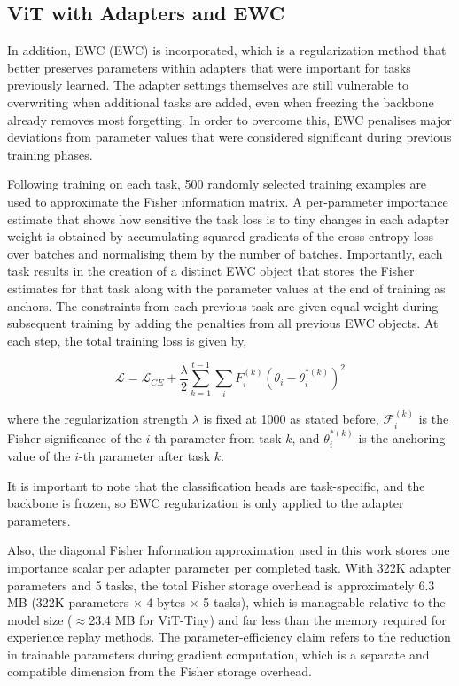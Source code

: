 \documentclass[english, LaM, oneside]{sapthesis}%
\numberwithin{equation}{chapter}
\begin{document}
\subsection{ViT with Adapters and EWC}
\label{sec:4.3.3}
In addition, EWC (EWC) is incorporated, which is a regularization method that better preserves parameters within adapters that were important for tasks previously learned. The adapter settings themselves are still vulnerable to overwriting when additional tasks are added, even when freezing the backbone already removes most forgetting. In order to overcome this, EWC penalises major deviations from parameter values that were considered significant during previous training phases.

Following training on each task, 500 randomly selected training examples are used to approximate the Fisher information matrix. A per-parameter importance estimate that shows how sensitive the task loss is to tiny changes in each adapter weight is obtained by accumulating squared gradients of the cross-entropy loss over batches and normalising them by the number of batches. Importantly, each task results in the creation of a distinct EWC object that stores the Fisher estimates for that task along with the parameter values at the end of training as anchors. The constraints from each previous task are given equal weight during subsequent training by adding the penalties from all previous EWC objects.
At each step, the total training loss is given by,

\begin{equation}
    \mathcal{L} = \mathcal{L}_{CE} + \frac{\lambda}{2} \sum_{k=1}^{t-1} \sum_{i} F_i^{(k)} {\left(\theta_i - \theta_i^{*(k)}\right)}^2
\end{equation}

where the regularization strength $\lambda$  is fixed at 1000 as stated before, $\mathcal{F}_i^{(k)}$ is the Fisher significance of the $i$-th parameter from task $k$, and $\theta_i^{*(k)}$ is the anchoring value of the $i$-th parameter after task $k$.

It is important to note that the classification heads are task-specific, and the backbone is frozen, so EWC regularization is only applied to the adapter parameters.

Also, the diagonal Fisher Information approximation used in this work stores one importance scalar per adapter parameter per completed task. With 322K adapter parameters and 5 tasks, the total Fisher storage overhead is approximately 6.3 MB (322K parameters × 4 bytes × 5 tasks), which is manageable relative to the model size ($\approx$23.4 MB for ViT-Tiny) and far less than the memory required for experience replay methods. The parameter-efficiency claim refers to the reduction in trainable parameters during gradient computation, which is a separate and compatible dimension from the Fisher storage overhead.
\end{document}
